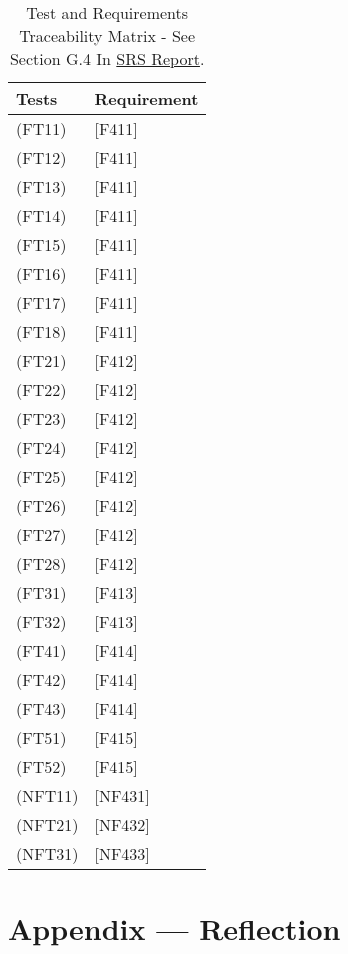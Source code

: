 \documentclass[12pt, titlepage]{article}
\begin{document}
\begin{table}[H]
  
  \centering
  \caption{Test and Requirements Traceability Matrix - See Section G.4 In \href{https://github.com/takhtart/PCD/blob/main/docs/SRS/SRS.pdf}{SRS Report}.}
  \begin{tabular}{|l|l|}
  \hline
  Tests   & Requirement \\
  \hline
  (FT11)  & {[}F411{]}  \\
  \hline
  (FT12)  & {[}F411{]}  \\
  \hline
  (FT13)  & {[}F411{]}  \\
  \hline
  (FT14)  & {[}F411{]}  \\
  \hline
  (FT15)  & {[}F411{]}  \\
  \hline
  (FT16)  & {[}F411{]}  \\
  \hline
  (FT17)  & {[}F411{]}  \\
  \hline
  (FT18)  & {[}F411{]}  \\
  \hline
  (FT21)  & {[}F412{]}  \\
  \hline
  (FT22)  & {[}F412{]}  \\
  \hline
  (FT23)  & {[}F412{]}  \\
  \hline
  (FT24)  & {[}F412{]}  \\
  \hline
  (FT25)  & {[}F412{]}  \\
  \hline
  (FT26)  & {[}F412{]}  \\
  \hline
  (FT27)  & {[}F412{]}  \\
  \hline
  (FT28)  & {[}F412{]}  \\
  \hline
  (FT31)  & {[}F413{]}  \\
  \hline
  (FT32)  & {[}F413{]}  \\
  \hline
  (FT41)  & {[}F414{]}  \\
  \hline
  (FT42)  & {[}F414{]}  \\
  \hline
  (FT43)  & {[}F414{]}  \\
  \hline
  (FT51)  & {[}F415{]}  \\
  \hline
  (FT52)  & {[}F415{]}  \\
  \hline
  (NFT11) & {[}NF431{]} \\
  \hline
  (NFT21) & {[}NF432{]} \\
  \hline
  (NFT31) & {[}NF433{]} \\ 
  \hline
  \end{tabular}
  \end{table}

\newpage{}
\section*{Appendix --- Reflection}
\end{document}
